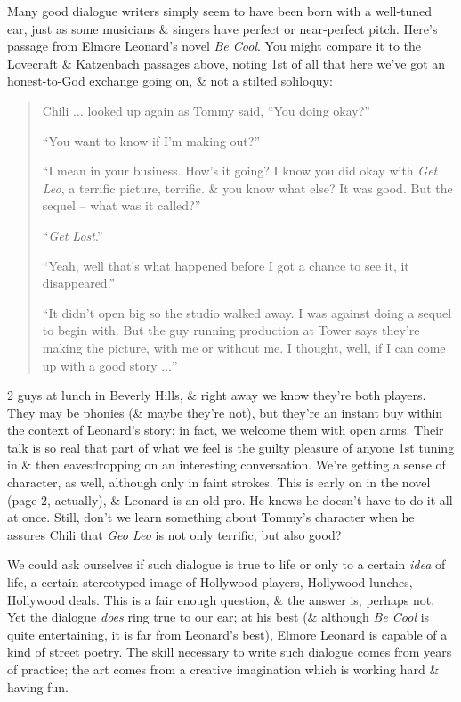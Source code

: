 \documentclass{article}
\numberwithin{equation}{section}
\begin{document}
Many good dialogue writers simply seem to have been born with a well-tuned ear, just as some musicians \& singers have perfect or near-perfect pitch. Here's passage from Elmore Leonard's novel \textit{Be Cool}. You might compare it to the Lovecraft \& Katzenbach passages above, noting 1st of all that here we've got an honest-to-God exchange going on, \& not a stilted soliloquy:
\begin{quotation}
	Chili $\ldots$ looked up again as Tommy said, ``You doing okay?''
	
	``You want to know if I'm making out?''
	
	``I mean in your business. How's it going? I know you did okay with \textit{Get Leo}, a terrific picture, terrific. \& you know what else? It was good. But the sequel -- what was it called?''
	
	``\textit{Get Lost}.''
	
	``Yeah, well that's what happened before I got a chance to see it, it disappeared.''
	
	``It didn't open big so the studio walked away. I was against doing a sequel to begin with. But the guy running production at Tower says they're making the picture, with me or without me. I thought, well, if I can come up with a good story $\ldots$''
\end{quotation}
2 guys at lunch in Beverly Hills, \& right away we know they're both players. They may be phonies (\& maybe they're not), but they're an instant buy within the context of Leonard's story; in fact, we welcome them with open arms. Their talk is so real that part of what we feel is the guilty pleasure of anyone 1st tuning in \& then eavesdropping on an interesting conversation. We're  getting a sense of character, as well, although only in faint strokes. This is early on in the novel (page 2, actually), \& Leonard is an old pro. He knows he doesn't have to do it all at once. Still, don't we learn something about Tommy's character when he assures Chili that \textit{Geo Leo} is not only terrific, but also good?

We could ask ourselves if such dialogue is true to life or only to a certain \textit{idea} of life, a certain stereotyped image of Hollywood players, Hollywood lunches, Hollywood deals. This is a fair enough question, \& the answer is, perhaps not. Yet the dialogue \textit{does} ring true to our ear; at his best (\& although \textit{Be Cool} is quite entertaining, it is far from Leonard's best), Elmore Leonard is capable of a kind of street poetry. The skill necessary to write such dialogue comes from years of practice; the art comes from a creative imagination which is working hard \& having fun.
\end{document}
